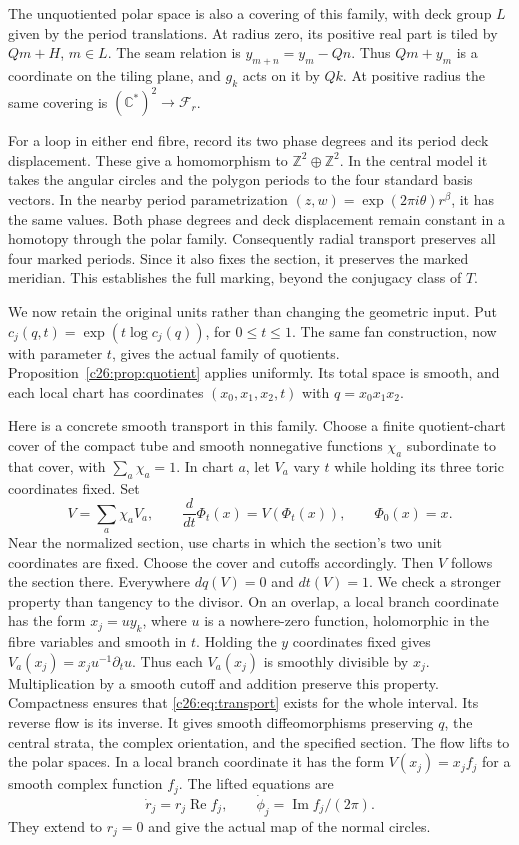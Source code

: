 The unquotiented polar space is also a covering of this family,
with deck group $L$ given by the period translations.
At radius zero, its positive real part is tiled by $Qm+H$, $m\in L$.
The seam relation is $y_{m+n}=y_m-Qn$.
Thus $Qm+y_m$ is a coordinate on the tiling plane,
and $g_k$ acts on it by $Qk$.
At positive radius the same covering is
$(\mathbb C^*)^2\to\mathcal F_r$.

For a loop in either end fibre, record its two phase degrees and its
period deck displacement. These give a homomorphism to
$\mathbb Z^2\oplus\mathbb Z^2$.
In the central model it takes the angular circles and the polygon
periods to the four standard basis vectors.
In the nearby period parametrization
$(z,w)=\exp(2\pi i\theta)r^\beta$, it has the same values.
Both phase degrees and deck displacement remain constant in a homotopy
through the polar family.
Consequently radial transport preserves all four marked periods.
Since it also fixes the section, it preserves the marked meridian.
This establishes the full marking, beyond the conjugacy class of $T$.

We now retain the original units rather than changing the geometric input.
Put $c_j(q,t)=\exp(t\log c_j(q))$, for $0\le t\le1$.
The same fan construction, now with parameter $t$, gives the actual
family of quotients. Proposition~\ref{c26:prop:quotient} applies uniformly.
Its total space is smooth, and each local chart has coordinates
$(x_0,x_1,x_2,t)$ with $q=x_0x_1x_2$.

Here is a concrete smooth transport in this family.
Choose a finite quotient-chart cover of the compact tube and smooth
nonnegative functions $\chi_a$ subordinate to that cover, with
$\sum_a\chi_a=1$. In chart $a$, let $V_a$ vary $t$ while holding its
three toric coordinates fixed. Set
\begin{equation}\label{c26:eq:transport}
V=\sum_a\chi_a V_a,
\qquad \frac{d}{dt}\Phi_t(x)=V(\Phi_t(x)),\qquad \Phi_0(x)=x.
\end{equation}
Near the normalized section, use charts in which the section's two
unit coordinates are fixed. Choose the cover and cutoffs accordingly.
Then $V$ follows the section there. Everywhere $dq(V)=0$ and
$dt(V)=1$. We check a stronger property than tangency to the divisor.
On an overlap, a local branch coordinate has the form $x_j=u y_k$,
where $u$ is a nowhere-zero function, holomorphic in the fibre variables
and smooth in $t$.
Holding the $y$ coordinates fixed gives
$V_a(x_j)=x_j u^{-1}\partial_tu$.
Thus each $V_a(x_j)$ is smoothly divisible by $x_j$.
Multiplication by a smooth cutoff and addition preserve this property.
Compactness ensures that \eqref{c26:eq:transport} exists for the whole interval.
Its reverse flow is its inverse. It gives smooth diffeomorphisms preserving
$q$, the central strata, the complex orientation, and the specified section.
The flow lifts to the polar spaces. In a local branch coordinate it
has the form $V(x_j)=x_j f_j$ for a smooth complex function $f_j$.
The lifted equations are
\[
\dot r_j=r_j\operatorname{Re}f_j,\qquad
\dot\phi_j=\operatorname{Im}f_j/(2\pi).
\]
They extend to $r_j=0$ and give the actual map of the normal circles.

